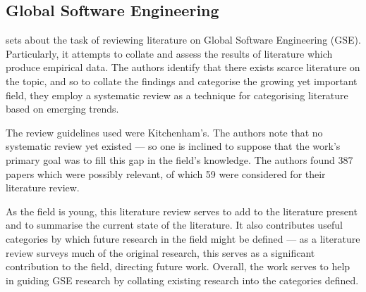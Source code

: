 \subsection{Global Software Engineering}
\citet*{Smite2010} sets about the task of reviewing literature on Global Software Engineering (GSE). Particularly, it attempts to collate and assess the results of literature which produce empirical data. The authors identify that there exists scarce literature on the topic, and so to collate the findings and categorise the growing yet important field, they employ a systematic review as a technique for categorising literature based on emerging trends.\par

The review guidelines used were Kitchenham's. The authors note that no systematic review yet existed --- so one is inclined to suppose that the work's primary goal was to fill this gap in the field's knowledge. The authors found 387 papers which were possibly relevant, of which 59 were considered for their literature review.\par

As the field is young, this literature review serves to add to the literature present and to summarise the current state of the literature. It also contributes useful categories by which future research in the field might be defined --- as a literature review surveys much of the original research, this serves as a significant contribution to the field, directing future work. Overall, the work serves to help in guiding GSE research by collating existing research into the categories defined.\par


